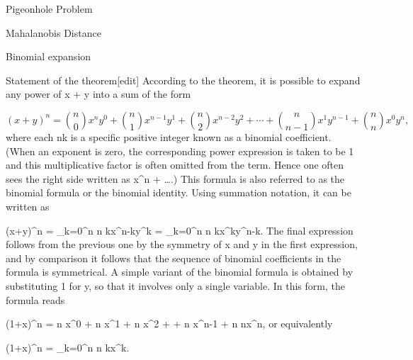 

Pigeonhole Problem


Mahalanobis Distance

%
Binomial expansion

Statement of the theorem[edit]
According to the theorem, it is possible to expand any power of x + y into a sum of the form

\[(x+y)^n = {n \choose 0}x^n y^0 + {n \choose 1}x^{n-1}y^1 + {n \choose 2}x^{n-2}y^2 + \cdots + {n \choose n-1}x^1 y^{n-1} + {n \choose n}x^0 y^n,\]
where each  \tbinom nk  is a specific positive integer known as a binomial coefficient. (When an exponent is zero, the corresponding power expression is taken to be 1 and this multiplicative factor is often omitted from the term. Hence one often sees the right side written as  x^n + \ldots.) This formula is also referred to as the binomial formula or the binomial identity. Using summation notation, it can be written as

(x+y)^n = \sum_{k=0}^n {n \choose k}x^{n-k}y^k = \sum_{k=0}^n {n \choose k}x^{k}y^{n-k}.
The final expression follows from the previous one by the symmetry of x and y in the first expression, and by comparison it follows that the sequence of binomial coefficients in the formula is symmetrical. A simple variant of the binomial formula is obtained by substituting 1 for y, so that it involves only a single variable. In this form, the formula reads

(1+x)^n = {n }x^0 + {n }x^1 + {n }x^2 + \cdots + {n }x^{n-1} + {n \choose n}x^n,
or equivalently

(1+x)^n = \sum_{k=0}^n {n \choose k}x^k.
